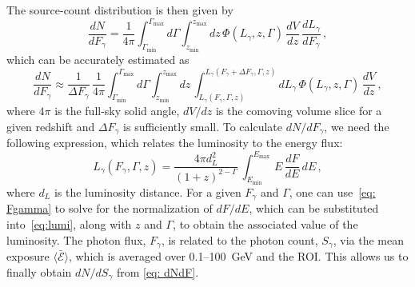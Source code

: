 The source-count distribution is then given by
\begin{equation}
\frac{dN}{dF_\gamma} = \frac{1}{4\pi} \int_{\Gamma_\text{min}}^{\Gamma_\text{max}} d\Gamma \int_{z_\text{min}}^{z_\text{max}} dz \, \Phi(L_\gamma,z,\Gamma) \, \frac{dV}{dz} \, \frac{dL_\gamma}{dF_{\gamma}} \, ,
\label{eq: dNdFexact}
\end{equation}
which can be accurately estimated as
\begin{equation}
\frac{dN}{dF_\gamma} \approx \frac{1}{\Delta F_\gamma} \, \frac{1}{4\pi} \int_{\Gamma_\text{min}}^{\Gamma_\text{max}} d\Gamma \int_{z_\text{min}}^{z_\text{max}} dz \, \int_{L_\gamma(F_\gamma, \Gamma,z)}^{L_\gamma(F_\gamma+\Delta F_\gamma, \Gamma,z)} dL_\gamma \, \Phi(L_\gamma,z,\Gamma) \, \frac{dV}{dz} \, ,
\label{eq: dNdF}
\end{equation}
where $4\pi$ is the full-sky solid angle, $dV/dz$ is the comoving volume slice for a given redshift and $\Delta F_\gamma$ is sufficiently small.  To calculate $dN/dF_\gamma$, we need the following expression, which relates the luminosity to the energy flux:
\begin{equation} 
L_\gamma(F_\gamma, \Gamma,z) = \frac{4\pi d_L^2}{(1+z)^{2-\Gamma}}  \, \int_{E_\text{min}}^{E_\text{max}} \, E\,\frac{dF}{dE}\, dE \, ,
\label{eq:lumi}
\end{equation}
where $d_L$ is the luminosity distance. For a given $F_\gamma$ and $\Gamma$, one can use~\eqref{eq: Fgamma} to solve for the normalization of $dF/dE$, which can be substituted into~\eqref{eq:lumi}, along with $z$ and $\Gamma$, to obtain the associated value of the luminosity. The photon flux, $F_\gamma$, is related to the photon count, $S_\gamma$, via the mean exposure $\langle \bar{\mathcal{E}} \rangle$, which is averaged over 0.1--100~GeV and the ROI.  This allows us to finally obtain $dN/dS_\gamma$ from \eqref{eq: dNdF}.

